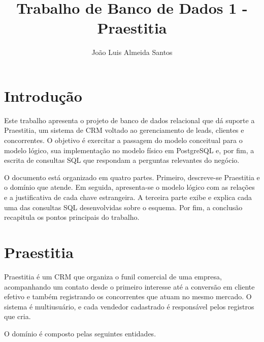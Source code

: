 \documentclass[a4paper]{article}
\begin{document}
\title{Trabalho de Banco de Dados 1 - Praestitia}
\author{João Luis Almeida Santos}
\maketitle

\tableofcontents
\newpage

\section{Introdução}

Este trabalho apresenta o projeto de banco de dados relacional que dá suporte a
Praestitia, um sistema de CRM voltado ao gerenciamento de leads, clientes e concorrentes.
O objetivo é exercitar a passagem do modelo conceitual para o modelo lógico, sua
implementação no modelo físico em PostgreSQL e, por fim, a escrita de consultas SQL que
respondam a perguntas relevantes do negócio.

O documento está organizado em quatro partes. Primeiro, descreve-se Praestitia e o
domínio que atende. Em seguida, apresenta-se o modelo lógico com as relações e a
justificativa de cada chave estrangeira. A terceira parte exibe e explica cada uma das
consultas SQL desenvolvidas sobre o esquema. Por fim, a conclusão recapitula os pontos
principais do trabalho.

\section{Praestitia}

Praestitia é um CRM que organiza o funil comercial de uma empresa, acompanhando um
contato desde o primeiro interesse até a conversão em cliente efetivo e também registrando
os concorrentes que atuam no mesmo mercado. O sistema é multiusuário, e cada vendedor
cadastrado é responsável pelos registros que cria.

O domínio é composto pelas seguintes entidades.
\end{document}
